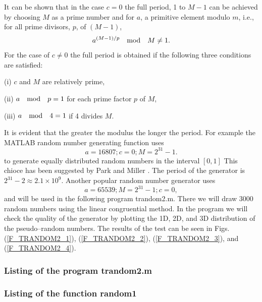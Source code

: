It can be shown \cite{Knuth}  that in the case $c=0$ the full 
period, 1 to $M-1$ can be achieved by choosing $M$ as a prime 
number and for $a$, a primitive element modulo $m$, i.e., for all 
prime divisors, $p$, of $(M-1)$, 
\begin{equation*}
a^{(M-1)/p} \quad {\rm mod} \quad M \ne 1.
\end{equation*}
For the case of $c\ne 0$ the full period is obtained if the 
following three conditions are satisfied:

(i) $c$ and $M$ are relatively prime,

(ii) $a \quad {\rm mod} \quad p = 1$ for each prime factor $p$ of $M$,

(iii) $a \quad {\rm mod} \quad 4 = 1$ if 4 divides $M$.

It is evident that the greater the modulus the longer the period.
For example the MATLAB random number generating function uses
\begin{equation*}
a= 16807; c=0; M=2^{31}-1.
\end{equation*}
to generate equally distributed random numbers in the interval
$[0,1]$
This chioce has been suggested by Park and Miller \cite{PRESS}.
The period of the generator is $2^{31}-2 \approx 2.1 \times 10^9$.
Another popular random number generator uses
\begin{equation*}
a= 65539; M=2^{31}-1; c=0,
\end{equation*}
and will be used in the following program {\sf trandom2.m}. There 
we will draw 3000 random numbers using the linear 
congruential method. In the program we will check the quality of 
the generator by plotting the 1D, 2D, and 3D distribution of the 
pseudo--random numbers. The results of the test can be seen in 
Figs. (\ref{F_TRANDOM2_1}), (\ref{F_TRANDOM2_2}), 
(\ref{F_TRANDOM2_3}), and (\ref{F_TRANDOM2_4}).

\subsubsection{Listing of the program trandom2.m}

\subsubsection{Listing of the function {\sf random1}}

